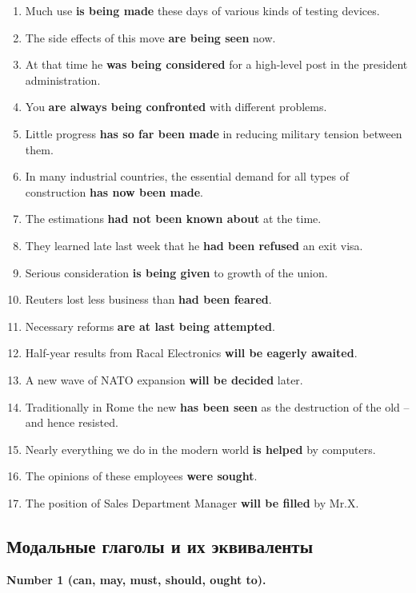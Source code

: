 \documentclass[main.tex]{subfiles}
\begin{document}
\begin{enumerate}[nosep]
	\item Much use \textbf{is being made} these days of various kinds of testing devices.
	\item The side effects of this move \textbf{are being seen} now.
	\item At that time he \textbf{was being considered} for a high-level post in the president administration.
	\item You \textbf{are always being confronted} with different problems.
	\item Little progress \textbf{has so far been made} in reducing military tension between them.
	\item In many industrial countries, the essential demand for all types of construction \textbf{has now been made}.
	\item The estimations \textbf{had not been known about} at the time.
	\item They learned late last week that he \textbf{had been refused} an exit visa.
	\item Serious consideration \textbf{is being given} to growth of the union.
	\item Reuters lost less business than \textbf{had been feared}.
	\item Necessary reforms \textbf{are at last being attempted}.
	\item Half-year results from Racal Electronics \textbf{will be eagerly awaited}.
	\item A new wave of NATO expansion \textbf{will be decided} later.
	\item Traditionally in Rome the new \textbf{has been seen} as the destruction of the old -- and hence resisted.
	\item Nearly everything we do in the modern world \textbf{is helped} by computers.
	\item The opinions of these employees \textbf{were sought}.
	\item The position of Sales Department Manager \textbf{will be filled} by Mr.X.
\end{enumerate}

\subsection{Модальные глаголы и их эквиваленты}

\textbf{Number 1 (can, may, must, should, ought to).}
\end{document}
